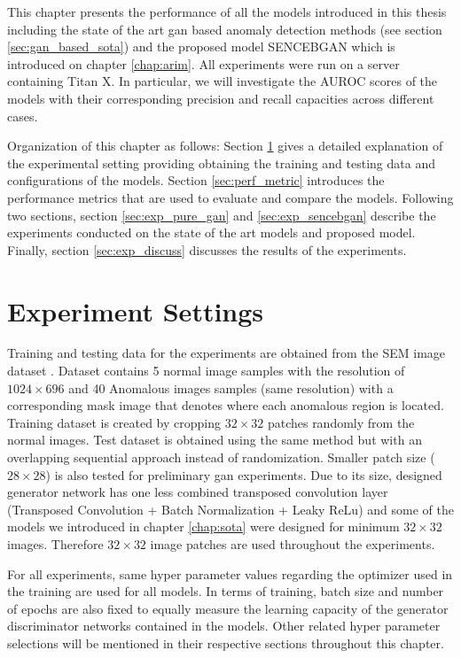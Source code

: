 
\begingroup

This chapter presents the performance of all the models introduced in this thesis including 
the state of the art gan based anomaly detection methods (see section \ref{sec:gan_based_sota}) and 
the proposed model SENCEBGAN which is introduced on chapter \ref{chap:arim}. All experiments were run on 
a server containing Titan X. In particular, we will investigate the AUROC scores of the models with their 
corresponding precision and recall capacities across different cases. 

Organization of this chapter as follows: Section \ref{sec:exp_settings} gives a detailed explanation 
of the experimental setting providing obtaining the training and testing data and configurations of 
the models. Section \ref{sec:perf_metric} introduces the performance metrics that are used to evaluate 
and compare the models. Following two sections, section \ref{sec:exp_pure_gan} and 
\ref{sec:exp_sencebgan} describe the experiments conducted on the state of the art models and 
proposed model. Finally, section \ref{sec:exp_discuss} discusses the results of the experiments.


\section{Experiment Settings}
\label{sec:exp_settings}
Training and testing data for the experiments are obtained from the SEM image dataset \cite{sem}. 
Dataset contains 5 normal image samples with the resolution of $1024 \times 696$ and 40 Anomalous 
images samples (same resolution) with a corresponding mask image that denotes where each anomalous 
region is located. Training dataset is created by cropping $32 \times 32$ patches randomly from 
the normal images. Test dataset is obtained using the same method but with an overlapping sequential 
approach instead of randomization. Smaller patch size ($28 \times 28$) is also tested for preliminary 
gan experiments. Due to its size, designed generator network has one less combined transposed 
convolution layer (Transposed Convolution + Batch Normalization + Leaky ReLu) and some of the models 
we introduced in chapter \ref{chap:sota} were designed for minimum $32 \times 32$ images. Therefore 
$32 \times 32$ image patches are used throughout the experiments.
 
For all experiments, same hyper parameter values regarding the optimizer used in the training are used 
for all models. In terms of training, batch size and number of epochs are also fixed to equally 
measure the learning capacity of the generator discriminator networks contained in the models. Other 
related hyper parameter selections will be mentioned in their respective sections throughout this chapter.

